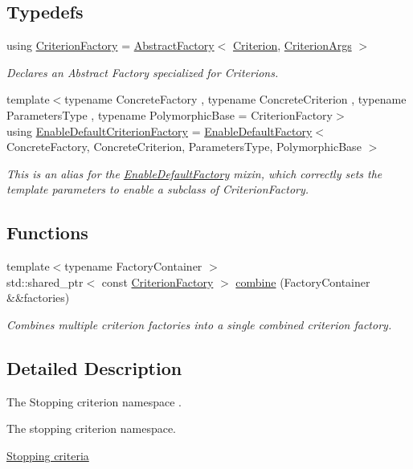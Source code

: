 \subsection*{Typedefs}
\begin{DoxyCompactItemize}
\item 
using \hyperlink{group__stop_gab12a51109c50b35ec36dc5a393d6a9a0}{Criterion\+Factory} = \hyperlink{classgko_1_1AbstractFactory}{Abstract\+Factory}$<$ \hyperlink{classgko_1_1stop_1_1Criterion}{Criterion}, \hyperlink{structgko_1_1stop_1_1CriterionArgs}{Criterion\+Args} $>$
\begin{DoxyCompactList}\small\item\em Declares an Abstract Factory specialized for Criterions. \end{DoxyCompactList}\item 
{\footnotesize template$<$typename Concrete\+Factory , typename Concrete\+Criterion , typename Parameters\+Type , typename Polymorphic\+Base  = Criterion\+Factory$>$ }\\using \hyperlink{group__stop_gab045b6fd7571f3234d9a63a5ee5a2252}{Enable\+Default\+Criterion\+Factory} = \hyperlink{classgko_1_1EnableDefaultFactory}{Enable\+Default\+Factory}$<$ Concrete\+Factory, Concrete\+Criterion, Parameters\+Type, Polymorphic\+Base $>$
\begin{DoxyCompactList}\small\item\em This is an alias for the \hyperlink{classgko_1_1EnableDefaultFactory}{Enable\+Default\+Factory} mixin, which correctly sets the template parameters to enable a subclass of Criterion\+Factory. \end{DoxyCompactList}\end{DoxyCompactItemize}
\subsection*{Functions}
\begin{DoxyCompactItemize}
\item 
{\footnotesize template$<$typename Factory\+Container $>$ }\\std\+::shared\+\_\+ptr$<$ const \hyperlink{group__stop_gab12a51109c50b35ec36dc5a393d6a9a0}{Criterion\+Factory} $>$ \hyperlink{group__stop_ga3a3325b3a7660501f3bb72d08b09f2d2}{combine} (Factory\+Container \&\&factories)
\begin{DoxyCompactList}\small\item\em Combines multiple criterion factories into a single combined criterion factory. \end{DoxyCompactList}\end{DoxyCompactItemize}


\subsection{Detailed Description}
The Stopping criterion namespace . 

The stopping criterion namespace.

\hyperlink{group__stop}{Stopping criteria} 